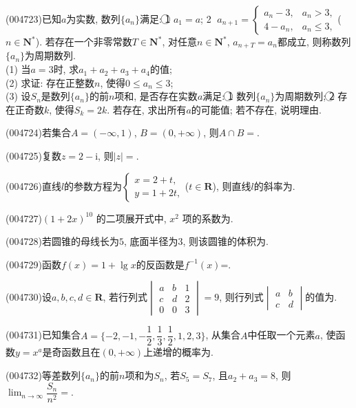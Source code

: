 \item (004723)已知$a$为实数, 数列$\{a_n\}$满足: \textcircled{1} $a_1=a$; \textcircled{2} $a_{n+1}=\begin{cases}
a_n-3, & a_n>3, \\ 4-a_n, & a_n\le 3,\end{cases}$($n\in \mathbf{N}^*$). 若存在一个非零常数$T\in \mathbf{N}^*$, 对任意$n\in \mathbf{N}^*$, $a_{n+T}=a_n$都成立, 则称数列$\{a_n\}$为周期数列.\\
(1) 当$a=3$时, 求$a_1+a_2+a_3+a_4$的值;\\
(2) 求证: 存在正整数$n$, 使得$0\le a_n\le 3$;\\
(3) 设$S_n$是数列$\{a_n\}$的前$n$项和, 是否存在实数$a$满足: \textcircled{1} 数列$\{a_n\}$为周期数列; \textcircled{2} 存在正奇数$k$, 使得$S_k=2k$. 若存在, 求出所有$a$的可能值; 若不存在, 说明理由.
\item (004724)若集合$A=(-\infty ,1)$, $B=(0,+\infty)$, 则$A\cap B=$.
\item (004725)复数$z=2-\mathrm{i}$, 则$|z|=$.
\item (004726)直线$l$的参数方程为$\begin{cases} x=2+t, \\ y=1+2t, \end{cases}$($t\in \mathbf{R}$), 则直线$l$的斜率为.
\item (004727)$(1+2x)^{10}$ 的二项展开式中, $x^2$ 项的系数为.
\item (004728)若圆锥的母线长为$5$, 底面半径为$3$, 则该圆锥的体积为.
\item (004729)函数$f(x)=1+\lg x$的反函数是$f^{-1}(x)$=.
\item (004730)设$a,b,c,d\in \mathbf{R}$, 若行列式$\begin{vmatrix}    a & b & 1  \\ c & d & 2  \\ 0 & 0 & 3  \end{vmatrix}=9$, 则行列式$\begin{vmatrix} a & b  \\ c & d  \end{vmatrix}$的值为.
\item (004731)已知集合$A=\{-2,-1,-\dfrac 12,\dfrac 13,\dfrac 12,1,2,3\}$, 从集合$A$中任取一个元素$a$, 使函数$y=x^a$是奇函数且在$(0,+\infty)$上递增的概率为.
\item (004732)等差数列$\{a_n\}$的前$n$项和为$S_n$, 若$S_5=S_7$, 且$a_2+a_3=8$, 则$\displaystyle\lim_{n\to\infty}\dfrac{S_n}{n^2}=$.
